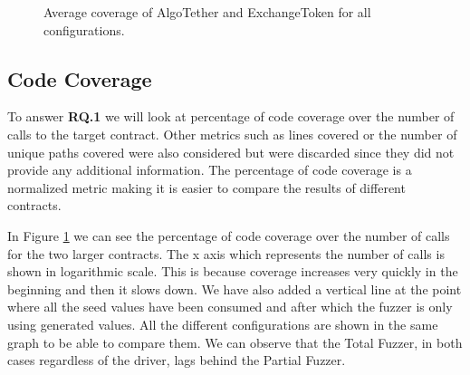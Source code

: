 \begin{figure}[!hbp]
    \centering
    \hfill
    \caption{Average coverage of AlgoTether and ExchangeToken for all configurations.}
    \label{fig:percent_coverage}
\end{figure}

\subsection*{Code Coverage} \label{section:results-code-coverage}
To answer \textbf{RQ.1} we will look at percentage of code coverage over the number of calls to the target contract.
Other metrics such as lines covered or the number of unique paths covered were also considered but were discarded since they did not provide any additional information.
The percentage of code coverage is a normalized metric making it is easier to compare the results of different contracts.

In Figure \ref{fig:percent_coverage} we can see the percentage of code coverage over the number of calls for the two larger contracts.
The x axis which represents the number of calls is shown in logarithmic scale.
This is because coverage increases very quickly in the beginning and then it slows down.
We have also added a vertical line at the point where all the seed values have been consumed and after which the fuzzer is only using generated values.
All the different configurations are shown in the same graph to be able to compare them.
We can observe that the Total Fuzzer, in both cases regardless of the driver, lags behind the Partial Fuzzer.

